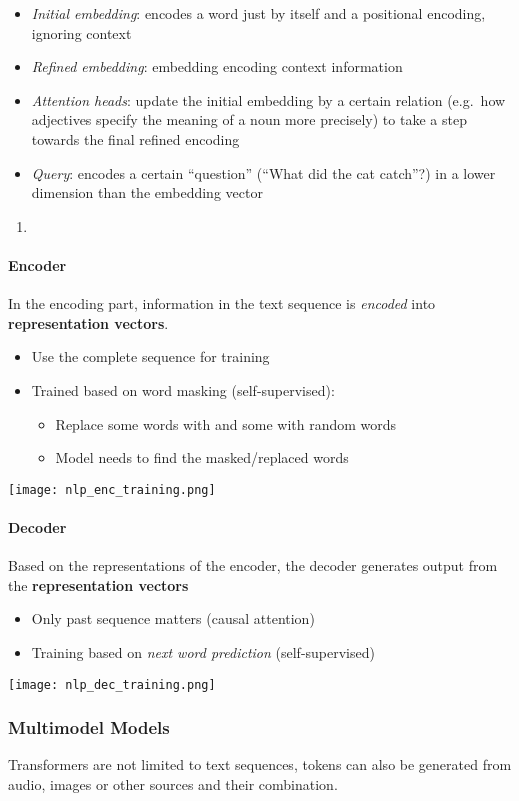 \newpar{}
\begin{itemize}
    \item \textit{Initial embedding}: encodes a word just by itself and a positional encoding, ignoring context 
    \item \textit{Refined embedding}: embedding encoding context information
    \item \textit{Attention heads}: update the initial embedding by a certain relation (e.g.\ how adjectives specify the meaning of a noun more precisely) to take a step towards the final refined encoding
    \item \textit{Query}: encodes a certain ``question'' (``What did the cat catch''?) in a lower dimension than the embedding vector
\end{itemize}
 
\newpar{}
\begin{enumerate}
    \item 
\end{enumerate}

\paragraph{Encoder}
In the encoding part, information in the text sequence is \textit{encoded} into \textbf{representation vectors}.
\newpar{}
\begin{itemize}
    \item Use the complete sequence for training
    \item Trained based on word masking (self-supervised):
          \begin{itemize}
              \item Replace some words with  and some with random words
              \item Model needs to find the masked/replaced words
          \end{itemize}
\end{itemize}
\begin{center}
    \texttt{[image: nlp\_enc\_training.png]}
\end{center}


\paragraph{Decoder}

Based on the representations of the encoder, the decoder generates output from the \textbf{representation vectors}
\newpar{}
\begin{itemize}
    \item Only past sequence matters (causal attention)
    \item Training based on \textit{next word prediction} (self-supervised)
\end{itemize}
\begin{center}
    \texttt{[image: nlp\_dec\_training.png]}
\end{center}

\subsubsection{Multimodel Models}
Transformers are not limited to text sequences, tokens can also be generated from audio, images or other sources and their combination.

